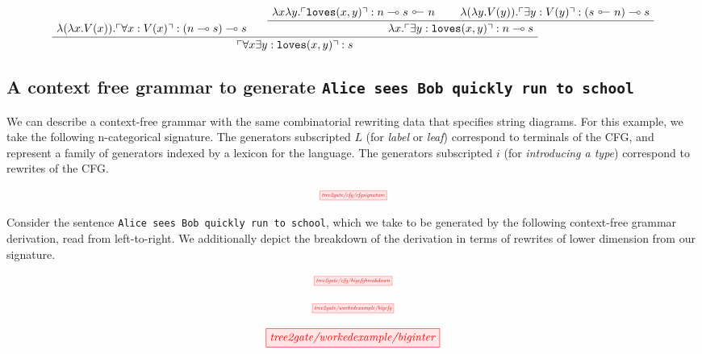 \begin{example}
\[
\AxiomC{$\lambda (\lambda x . V(x)) . \ulcorner \forall x : V(x) \urcorner : (n \multimap s) \multimap s$}
\AxiomC{$\lambda x \lambda y . \ulcorner \texttt{loves}(x,y) \urcorner : n \multimap s \ \rotatebox[origin=c]{180}{$\multimap$} \ n$}
\AxiomC{$\lambda (\lambda y . V(y)) . \ulcorner \exists y : V(y) \urcorner : (s \ \rotatebox[origin=c]{180}{$\multimap$} \ n) \multimap s$}
\BinaryInfC{$\lambda x . \ulcorner \exists y : \texttt{loves}(x,y) \urcorner : n \multimap s$}
\BinaryInfC{$ \ulcorner \forall x \exists y : \texttt{loves}(x,y) \urcorner : s$}
\DisplayProof
\]

\end{example}


\begin{fullwidth}

\subsection{A context free grammar to generate \texttt{Alice sees Bob quickly run to school}}

We can describe a context-free grammar with the same combinatorial rewriting data that specifies string diagrams. For this example, we take the following n-categorical signature. The generators subscripted $L$ (for \emph{label} or \emph{leaf}) correspond to terminals of the CFG, and represent a family of generators indexed by a lexicon for the language. The generators subscripted $i$ (for \emph{introducing a type}) correspond to rewrites of the CFG.

\[\scalebox{0.5}{\tikzfig{tree2gate/cfg/cfgsignature}}\]

Consider the sentence \texttt{Alice sees Bob quickly run to school}, which we take to be generated by the following context-free grammar derivation, read from left-to-right. We additionally depict the breakdown of the derivation in terms of rewrites of lower dimension from our signature.

\[\scalebox{0.5}{\tikzfig{tree2gate/cfg/bigcfgbreakdown}}\]

\[\scalebox{0.5}{\tikzfig{tree2gate/workedexample/bigcfg}}\]

\[\tikzfig{tree2gate/workedexample/biginter}\]

\end{fullwidth}
